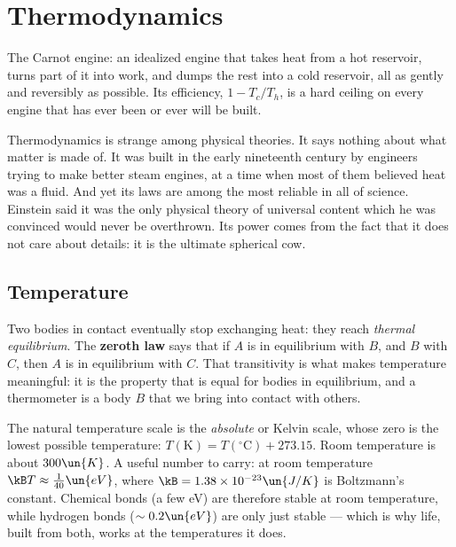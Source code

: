 \chapter{Thermodynamics}
\label{ch:thermo}



\begin{prototype}
The Carnot engine: an idealized engine that takes heat from a hot reservoir, turns part of it into work, and dumps the rest into a cold reservoir, all as gently and reversibly as possible. Its efficiency, $1 - T_c/T_h$, is a hard ceiling on every engine that has ever been or ever will be built.
\end{prototype}

Thermodynamics is strange among physical theories. It says nothing about what matter is made of. It was built in the early nineteenth century by engineers trying to make better steam engines, at a time when most of them believed heat was a fluid. And yet its laws are among the most reliable in all of science. Einstein said it was the only physical theory of universal content which he was convinced would never be overthrown. Its power comes from the fact that it does not care about details: it is the ultimate spherical cow.

\section{Temperature}

Two bodies in contact eventually stop exchanging heat: they reach \emph{thermal equilibrium}. The \textbf{zeroth law} says that if $A$ is in equilibrium with $B$, and $B$ with $C$, then $A$ is in equilibrium with $C$. That transitivity is what makes temperature meaningful: it is the property that is equal for bodies in equilibrium, and a thermometer is a body $B$ that we bring into contact with others.

The natural temperature scale is the \emph{absolute} or Kelvin scale, whose zero is the lowest possible temperature: $T(\text{K}) = T(^\circ\text{C}) + 273.15$. Room temperature is about $300\un{K}$. A useful number to carry: at room temperature $\kB T\approx\tfrac1{40}\un{eV}$, where $\kB = 1.38\times10^{-23}\un{J/K}$ is Boltzmann's constant. Chemical bonds (a few eV) are therefore stable at room temperature, while hydrogen bonds ($\sim0.2\un{eV}$) are only just stable --- which is why life, built from both, works at the temperatures it does.

